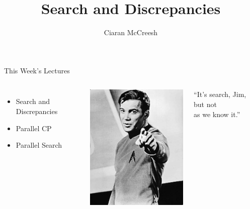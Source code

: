 \documentclass{beamer}
\title{Search and Discrepancies}
\author[Ciaran McCreesh]{\textcolor{uofgblue}{Ciaran McCreesh}}
\begin{document}
{
    \begin{frame}[plain]
        \titlepage
    \end{frame}
}

\begin{frame}{This Week's Lectures}
    \begin{columns}
        \begin{itemize}
            \item Search and Discrepancies
            \item Parallel CP
            \item Parallel Search
        \end{itemize}
        \centering\includegraphics*[keepaspectratio=true,scale=0.5]{search-but-not-as-we-know-it.jpg}
        \begin{center}``It's search, Jim, but not\\as we know it.''\end{center}
    \end{columns}
\end{frame}
\end{document}
